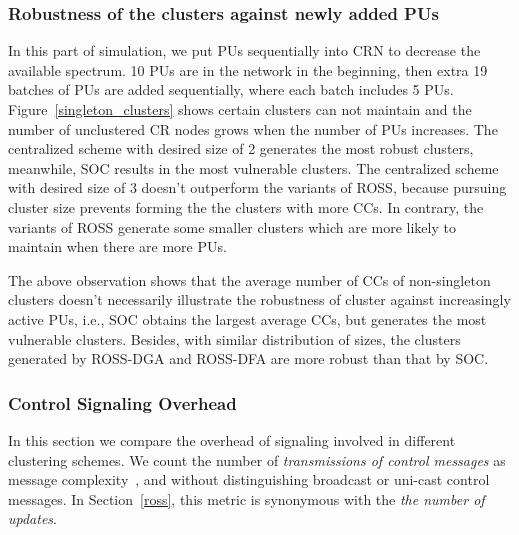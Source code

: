 \documentclass[10pt,journal,compsoc]{IEEEtran}
\theoremstyle{mytheoremstyle}
\theoremstyle{mytheoremstyle}
\theoremstyle{mytheoremstyle}
\newcommand{\ie}{i.e., }
\begin{document}
\subsubsection{Robustness of the clusters against newly added PUs}
In this part of simulation, we put PUs sequentially into CRN to decrease the available spectrum.
10 PUs are in the network in the beginning, then extra 19 batches of PUs are added sequentially, where each batch includes 5 PUs. 
%
Figure~\ref{singleton_clusters} shows certain clusters can not maintain and the number of unclustered CR nodes grows when the number of PUs increases.
The centralized scheme with desired size of 2 generates the most robust clusters, meanwhile, SOC results in the most vulnerable clusters.
The centralized scheme with desired size of 3 doesn't outperform the variants of ROSS, because pursuing cluster size prevents forming the the clusters with more CCs.
In contrary, the variants of ROSS generate some smaller clusters which are more likely to maintain when there are more PUs.

The above observation shows that the average number of CCs of non-singleton clusters doesn't necessarily illustrate the robustness  of cluster against increasingly active PUs, \ie SOC obtains the largest average CCs, but generates the most vulnerable clusters.
Besides, with similar distribution of sizes, the clusters generated by ROSS-DGA and ROSS-DFA are more robust than that by SOC.


\subsubsection{Control Signaling Overhead}

In this section we compare the overhead of signaling involved in different clustering schemes.
We count the number of \textit{transmissions of control messages} as message complexity~\cite{complexity_aggregation_2011}, and without distinguishing broadcast or uni-cast control messages.
In Section~\ref{ross}, this metric is synonymous with the \textit{the number of updates}.
\end{document}
